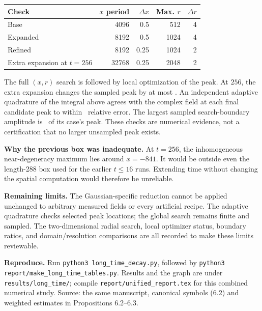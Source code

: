 \documentclass[10pt,letterpaper]{article}
\begin{document}
\begin{center}\begin{tabular}{lrrrr}\toprule
Check & $x$ period & $\Delta x$ & Max. $r$ & $\Delta r$\\\midrule
Base & 4096 & 0.5 & 512 & 4\\
Expanded & 8192 & 0.5 & 1024 & 4\\
Refined & 8192 & 0.25 & 1024 & 2\\
Extra expansion at $t=256$ & 32768 & 0.25 & 2048 & 2\\\bottomrule
\end{tabular}\end{center}
The full $(x,r)$ search is followed by local optimization of the peak. At $256$,
the extra expansion changes the sampled peak by at most \LongDomain. An independent
adaptive quadrature of the integral above agrees with the complex field at each
final candidate peak to within \LongQuad\ relative error. The largest sampled
search-boundary amplitude is \LongEdge\ of its case's peak. These checks are
numerical evidence, not a certification that no larger unsampled peak exists.

\textbf{Why the previous box was inadequate.} At $t=256$, the inhomogeneous
near-degeneracy maximum lies around $x=-841$. It would be outside even the
length-288 box used for the earlier $t\le16$ runs. Extending time without changing
the spatial computation would therefore be unreliable.

\textbf{Remaining limits.} The Gaussian-specific reduction cannot be applied
unchanged to arbitrary measured fields or every artificial recipe. The adaptive
quadrature checks selected peak locations; the global search remains finite and
sampled. The two-dimensional radial search, local optimizer status, boundary ratios,
and domain/resolution comparisons are all recorded to make these limits reviewable.

\textbf{Reproduce.} Run \texttt{python3 long\_time\_decay.py}, followed by
\texttt{python3 report/make\_long\_time\_tables.py}. Results and the graph are under
\texttt{results/long\_time/}; compile \texttt{report/unified\_report.tex} for this
combined numerical study. Source: the same manuscript, canonical symbols (6.2) and
weighted estimates in Propositions 6.2--6.3.



\end{document}
